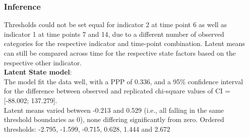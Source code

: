 \subsubsection{Inference}

Thresholds could not be set equal for indicator 2 at time point 6 as well as indicator 1 at time points 7 and 14, due to a different number of observed categories for the respective indicator and time-point combination. Latent means can still be compared across time for the respective state factors based on the respective other indicator. \\

\textbf{Latent State model}: \\
The model fit the data well, with a PPP of 0.336, and a 95\% confidence interval for the difference between observed and replicated chi-square values of CI =  [-88.002; 137.279]. \\ Latent means varied between -0.213  and 0.529 (i.e., all falling in the same threshold boundaries as 0), none differing significantly from zero. Ordered thresholds:  -2.795, -1.599, -0.715, 0.628, 1.444 and 2.672 \\



